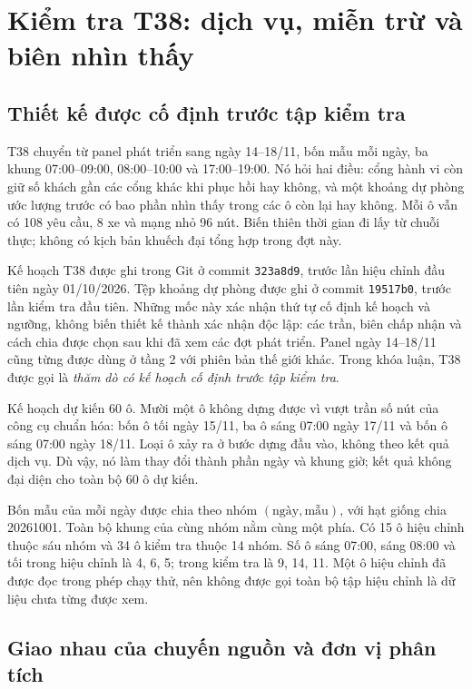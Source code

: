 \section{Kiểm tra T38: dịch vụ, miễn trừ và biên nhìn thấy}
\label{muc:t38}
\label{muc:biendukien-t38}

\subsection{Thiết kế được cố định trước tập kiểm tra}

T38 chuyển từ panel phát triển sang ngày 14--18/11, bốn mẫu mỗi ngày, ba khung
07:00--09:00, 08:00--10:00 và 17:00--19:00. Nó hỏi hai điều: cổng hành vi còn
giữ số khách gần các cổng khác khi phục hồi hay không, và một khoảng dự phòng
ước lượng trước có bao phần nhìn thấy trong các ô còn lại hay không. Mỗi ô
vẫn có 108 yêu cầu, 8 xe và mạng nhỏ 96 nút. Biến thiên thời gian đi lấy từ
chuỗi thực; không có kịch bản khuếch đại tổng hợp trong đợt này.

Kế hoạch T38 được ghi trong Git ở commit \texttt{323a8d9}, trước lần hiệu chỉnh
đầu tiên ngày 01/10/2026. Tệp khoảng dự phòng được ghi ở commit
\texttt{19517b0}, trước lần kiểm tra đầu tiên. Những mốc này xác nhận thứ tự
cố định kế hoạch và ngưỡng, không biến thiết kế thành xác nhận độc lập:
các trần, biên chấp nhận và cách chia được chọn sau khi đã xem các đợt phát triển.
Panel ngày 14--18/11 cũng từng được dùng ở tầng 2 với phiên bản thế giới khác.
Trong khóa luận, T38 được gọi là \emph{thăm dò có kế hoạch cố định trước tập kiểm tra}.

Kế hoạch dự kiến 60 ô. Mười một ô không dựng được vì vượt trần số nút của
công cụ chuẩn hóa: bốn ô tối ngày 15/11, ba ô sáng 07:00 ngày 17/11 và bốn ô
sáng 07:00 ngày 18/11. Loại ô xảy ra ở bước dựng đầu vào, không theo kết quả
dịch vụ. Dù vậy, nó làm thay đổi thành phần ngày và khung giờ; kết quả không
đại diện cho toàn bộ 60 ô dự kiến.

Bốn mẫu của mỗi ngày được chia theo nhóm $(\text{ngày},\text{mẫu})$, với hạt
giống chia 20261001. Toàn bộ khung của cùng nhóm nằm cùng một phía. Có 15 ô
hiệu chỉnh thuộc sáu nhóm và 34 ô kiểm tra thuộc 14 nhóm. Số ô sáng 07:00,
sáng 08:00 và tối trong hiệu chỉnh là 4, 6, 5; trong kiểm tra là 9, 14, 11.
Một ô hiệu chỉnh đã được đọc trong phép chạy thử, nên không được gọi toàn
bộ tập hiệu chỉnh là dữ liệu chưa từng được xem.

\subsection{Giao nhau của chuyến nguồn và đơn vị phân tích}



